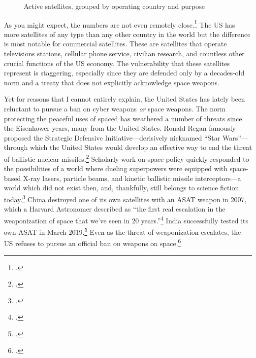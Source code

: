 \documentclass[11pt]{memoir}
\begin{document}
\begin{figure}[ht]
	\small
	\centering
	
	\label{country_sats}
	\caption{Active satellites, grouped by operating country and purpose}
\end{figure}
As you might expect, the numbers are not even remotely close.\footcite[A few satellites are listed as dual-purpose (i.e. Government/Military), and those are counted twice, once for each purpose. For instance, the data shows that the US is currently operating 830 satellites, while adding up the bars in this chart would give you 966. I made this choice to emphasize the dependency of various social systems on the existing satellite infrastructure.]{union_of_concerned_scientists_ucs_2018} The US has more satellites of any type than any other country in the world but the difference is most notable for commercial satellites. These are satellites that operate televisions stations, cellular phone service, civilian research, and countless other crucial functions of the US economy. The vulnerability that these satellites represent is staggering, especially since they are defended only by a decades-old norm and a treaty that does not explicitly acknowledge space weapons.

Yet for reasons that I cannot entirely explain, the United States has lately been reluctant to pursue a ban on cyber weapons \emph{or} space weapons. The norm protecting the peaceful uses of spaced has weathered a number of threats since the Eisenhower years, many from the United States. Ronald Regan famously proposed the Strategic Defensive Initiative---derisively nicknamed ``Star Wars''---through which the United States would develop an effective way to end the threat of ballistic nuclear missiles.\footcite{reagan_address_1983} Scholarly work on space policy quickly responded to the possibilities of a world where dueling superpowers were equipped with space-based X-ray lasers, particle beams, and kinetic ballistic missile interceptors---a world which did not exist then, and, thankfully, still belongs to science fiction today.\footcite[p.~1-2]{moorhead_work_2013} China destroyed one of its own satellites with an ASAT weapon in 2007, which a Harvard Astronomer described as ``the first real escalation in the weaponization of space that we’ve seen in 20 years.''\footcite{broad_china_2007} India successfully tested its own ASAT in March 2019.\footcite{gettleman_india_2019} Even as the threat of weaponization escalates, the US refuses to pursue an official ban on weapons on space.\footcite{oconnor_u.s._2019}
\end{document}
